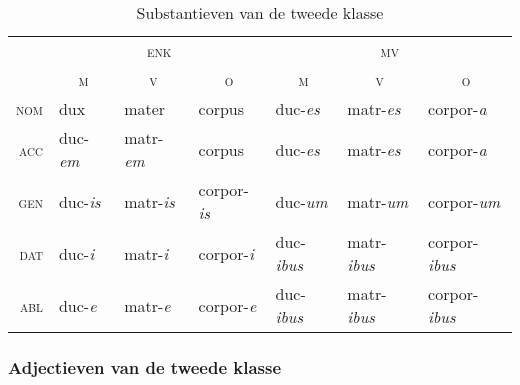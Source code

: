 \documentclass[12pt,a4paper]{article}
\begin{document}
\begin{table}[H]
\centering
\begin{tabular}{ r | l l l | l l l }
\toprule
 & \multicolumn{3}{c|}{\textsc{enk}} & \multicolumn{3}{c}{\textsc{mv}} \\
 & \multicolumn{1}{c}{\textsc{m}} & \multicolumn{1}{c}{\textsc{v}} & \multicolumn{1}{c|}{\textsc{o}} & \multicolumn{1}{c}{\textsc{m}} & \multicolumn{1}{c}{\textsc{v}} & \multicolumn{1}{c}{\textsc{o}} \\ 
\midrule
\textsc{nom} & dux            & mater          & corpus           & duc-\emph{es}   & matr-\emph{es}   & corpor-\emph{a} \\
\textsc{acc} & duc-\emph{em}  & matr-\emph{em} & corpus           & duc-\emph{es}   & matr-\emph{es}   & corpor-\emph{a} \\
\textsc{gen} & duc-\emph{is}  & matr-\emph{is} & corpor-\emph{is} & duc-\emph{um}   & matr-\emph{um}   & corpor-\emph{um} \\
\textsc{dat} & duc-\emph{i}   & matr-\emph{i}  & corpor-\emph{i}  & duc-\emph{ibus} & matr-\emph{ibus} & corpor-\emph{ibus} \\
\textsc{abl} & duc-\emph{e}   & matr-\emph{e}  & corpor-\emph{e}  & duc-\emph{ibus} & matr-\emph{ibus} & corpor-\emph{ibus} \\
\bottomrule
\end{tabular}
\caption{Substantieven van de tweede klasse}
\label{tab:subst2}
\end{table}

\subsubsection{Adjectieven van de tweede klasse}
\end{document}
